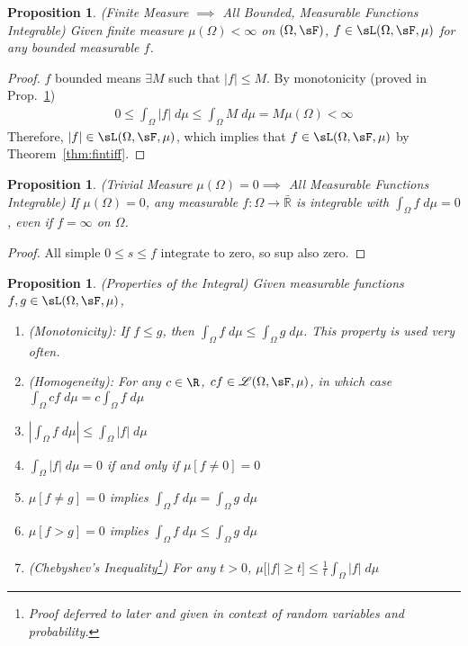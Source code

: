 \documentclass[12pt]{article}
\theoremstyle{plain}
\newtheorem{prop}[thm]{Proposition}
\theoremstyle{definition}
\theoremstyle{remark}
\begin{document}
\begin{prop}
\emph{(Finite Measure $\implies$ All Bounded, Measurable Functions
Integrable)}
Given finite measure $\mu(\Omega)<\infty$ on
$(\Omega,\sF)$, $f\in \sL(\Omega,\sF,\mu)$ for any \emph{bounded}
measurable $f$.
\end{prop}
\begin{proof}
$f$ bounded means $\exists M$ such that $|f|\leq M$.
By monotonicity (proved in Prop.~\ref{prop:intprop})
\begin{align*}
  0 \leq \int_\Omega |f|\;d\mu \leq \int_\Omega M \; d\mu
  = M\mu(\Omega)<\infty
\end{align*}
Therefore, $|f|\in\sL(\Omega,\sF,\mu)$, which implies that
$f\in\sL(\Omega,\sF,\mu)$ by Theorem~\ref{thm:fintiff}.
\end{proof}

\begin{prop}
\emph{(Trivial Measure $\mu(\Omega)=0\implies$ All Measurable Functions
Integrable)}
If $\mu(\Omega)=0$, \emph{any} measurable
$f: \Omega\rightarrow\bar{\mathbb{R}}$ is integrable with
$\int_\Omega f \; d\mu=0$, even if $f=\infty$ on $\Omega$.
\end{prop}
\begin{proof}
All simple $0\leq s\leq f$ integrate to zero, so sup also zero.
\end{proof}

\clearpage
\begin{prop}\emph{(Properties of the Integral)}
\label{prop:intprop}
Given measurable functions $f,g\in\sL(\Omega,\sF,\mu)$,
\begin{enumerate}[label=\emph{(\roman*)}]
  \item \emph{(Monotonicity)}:
    If $f\leq g$, then $\int_\Omega f \; d\mu \leq \int_\Omega g \;d\mu$.
    This property is used very often.
  \item \emph{(Homogeneity)}:
    For any $c\in\R$, $cf\in\mathscr{L}(\Omega,\sF,\mu)$, in which case
    $\int_\Omega cf\;d\mu = c\int_\Omega f\;d\mu$
  \item
    $\left\lvert \int_\Omega f \; d\mu\right\rvert \leq
    \int_\Omega \left\lvert f \right\rvert \; d\mu$
  \item
    $\int_\Omega |f| \; d\mu = 0$ if and only if $\mu[f\neq 0] = 0$
  \item $\mu[f\neq g] = 0$ implies
    $\int_\Omega f \; d\mu = \int_\Omega g \; d\mu$
  \item $\mu[f > g] = 0$ implies
    $\int_\Omega f \; d\mu \leq \int_\Omega g \; d\mu$
  \item \emph{(Chebyshev's Inequality\footnote{%
      Proof deferred to later and given in context of random variables
      and probability.
    })}
    For any $t>0$,
    $\mu\big[|f|\geq t\big] \leq \frac{1}{t}\int_{\Omega} |f|\; d\mu$
\end{enumerate}
\end{prop}
\end{document}
